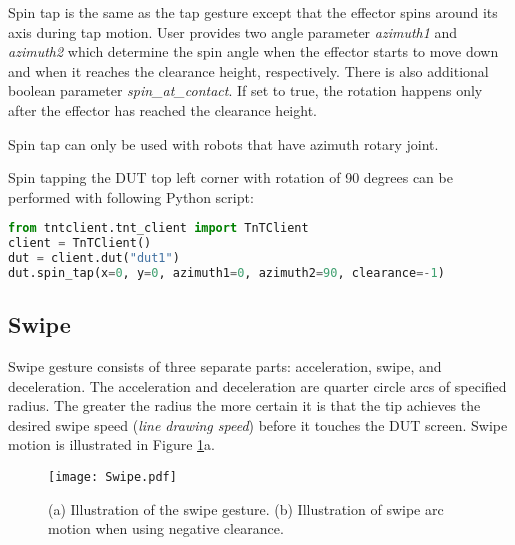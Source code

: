Spin tap is the same as the tap gesture except that the effector spins around its axis during tap motion. User provides two angle parameter \emph{azimuth1} and \emph{azimuth2} which determine the spin angle when the effector starts to move down and when it reaches the clearance height, respectively. There is also additional boolean parameter \emph{spin\_at\_contact}. If set to true, the rotation happens only after the effector has reached the clearance height.

Spin tap can only be used with robots that have azimuth rotary joint.

Spin tapping the DUT top left corner with rotation of 90 degrees can be  performed with following Python script:

\begin{lstlisting}[language=Python]
from tntclient.tnt_client import TnTClient
client = TnTClient()
dut = client.dut("dut1")
dut.spin_tap(x=0, y=0, azimuth1=0, azimuth2=90, clearance=-1)
\end{lstlisting}

\subsection{Swipe} 
Swipe gesture consists of three separate parts: acceleration, swipe, and deceleration. The acceleration and deceleration are quarter circle arcs of specified radius. The greater the radius the more certain it is that the tip achieves the desired swipe speed (\textit{line drawing speed}) before it touches the DUT screen. Swipe motion is illustrated in Figure \ref{fig:swipe_gesture}a.

\begin{figure}[h]
	\centering
	\texttt{[image: Swipe.pdf]}
	\caption{(a) Illustration of the swipe gesture. (b) Illustration of swipe arc motion when using negative clearance.}
	\label{fig:swipe_gesture}
\end{figure}


